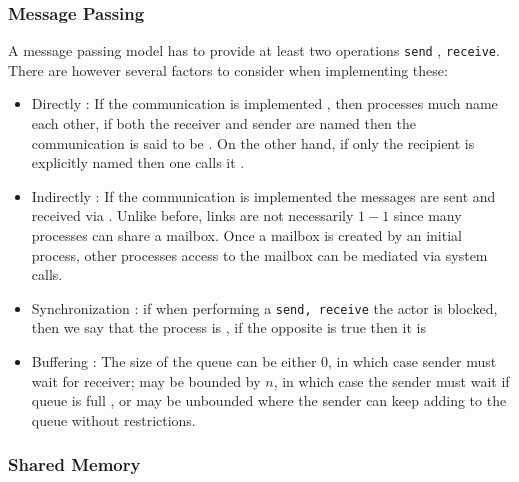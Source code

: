 	\subsubsection{Message Passing}

		\par{A message passing model has to provide at least two operations \texttt{send} , \texttt{receive}. There are however several factors to consider when implementing these:}

		\begin{itemize}
			\item Directly : If the communication is implemented , then processes much name each other, if both the receiver and sender are named then the communication is said to be . On the other hand, if only the recipient is explicitly named then one calls it . 
			\item Indirectly : If the communication is implemented  the messages are sent and received via . Unlike before, links are not necessarily $1-1$ since many processes can share a mailbox. Once a mailbox is created by an initial process, other processes access to the mailbox can be mediated via system calls.
			\item Synchronization : if when performing a \texttt{send, receive} the actor is blocked, then we say that the process is , if the opposite is true then it is 
			\item Buffering : The size of the queue can be either 0, in which case sender must wait for receiver; may be bounded by $n$, in which case the sender must wait if queue is full , or may be unbounded where the sender can keep adding to the queue without restrictions.
		\end{itemize}

	\subsubsection{Shared Memory}


